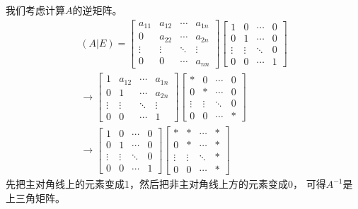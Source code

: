 \documentclass{article}
\begin{document}
\begin{itemize}
        我们考虑计算$A$的逆矩阵。
        \begin{align*}
          (A \vert E) =
          \begin{bmatrix}
            a_{11} & a_{12} & \cdots & a_{1n} \\
            0      & a_{22} & \cdots & a_{2n} \\
            \vdots & \vdots & \ddots & \vdots \\
            0      & 0      & \cdots & a_{nn}
          \end{bmatrix}
          \begin{bmatrix}
            1      & 0      & \cdots & 0 \\
            0      & 1      & \cdots & 0 \\
            \vdots & \vdots & \ddots & 0 \\
            0      & 0      & \cdots & 1
          \end{bmatrix} \\
          \xrightarrow{}
          \begin{bmatrix}
            1      & a_{12} & \cdots & a_{1n} \\
            0      & 1      & \cdots & a_{2n} \\
            \vdots & \vdots & \ddots & \vdots \\
            0      & 0      & \cdots & 1
          \end{bmatrix}
          \begin{bmatrix}
            *      & 0      & \cdots & 0 \\
            0      & *      & \cdots & 0 \\
            \vdots & \vdots & \ddots & 0 \\
            0      & 0      & \cdots & *
          \end{bmatrix} \\
          \xrightarrow{}
          \begin{bmatrix}
            1      & 0      & \cdots & 0 \\
            0      & 1      & \cdots & 0 \\
            \vdots & \vdots & \ddots & 0 \\
            0      & 0      & \cdots & 1
          \end{bmatrix}
          \begin{bmatrix}
            *      & *      & \cdots & * \\
            0      & *      & \cdots & * \\
            \vdots & \vdots & \ddots & * \\
            0      & 0      & \cdots & *
          \end{bmatrix}
        \end{align*}
        先把主对角线上的元素变成1，然后把非主对角线上方的元素变成0，
        可得$A^{-1}$是上三角矩阵。
\end{itemize}
\end{document}
